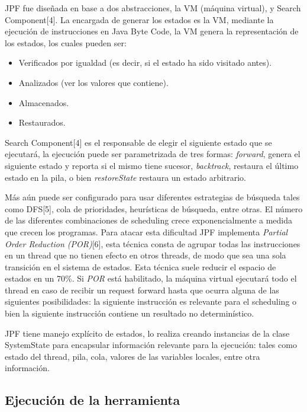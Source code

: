 \documentclass[runningheads]{llncs}
\begin{document}
JPF fue dise\~nada en base a dos abstracciones, la VM (m\'aquina virtual), y Search Component[4].
La encargada de generar los estados es la VM, mediante la ejecuci\'on de instrucciones en Java Byte Code, la VM  genera la representaci\'on de los estados, los cuales pueden ser:

\begin{itemize}
\item Verificados por igualdad (es decir, si el estado ha sido visitado antes).
\item Analizados (ver los valores que contiene).
\item Almacenados.
\item Restaurados.
\end{itemize}

Search Component[4] es el responsable de elegir el siguiente estado que se ejecutar\'a, la ejecuci\'on puede ser parametrizada de tres formas: \textit{forward}, genera el siguiente estado y reporta si el mismo tiene sucesor, \textit{backtrack}, restaura el \'ultimo estado en la pila, o bien \textit{restoreState} restaura un estado arbitrario.

M\'as a\'un puede ser configurado para usar diferentes estrategias de b\'usqueda tales como DFS[5], cola de prioridades, heur\'isticas de b\'usqueda,  entre otras.
El n\'umero de las diferentes combinaciones de scheduling crece exponencialmente a medida que crecen los programas. Para atacar esta dificultad JPF implementa \textit{Partial Order Reduction (POR)}[6], esta t\'ecnica consta de agrupar todas las instrucciones en un thread que no tienen efecto en otros threads, de modo que sea una sola transici\'on en el sistema de estados. Esta t\'ecnica suele reducir el espacio de estados en un 70\%.
Si \textit{POR} est\'a habilitado, la máquina virtual ejecutar\'a todo el thread en caso de recibir un request forward hasta que ocurra alguna de las siguientes posibilidades: la siguiente instrucci\'on es relevante para el scheduling o bien la siguiente instrucci\'on contiene un resultado no determin\'istico.

JPF tiene manejo expl\'icito de estados, lo realiza creando instancias de la clase SystemState para encapsular informaci\'on relevante para la ejecuci\'on: tales como estado del thread, pila, cola, valores de las variables locales, entre otra informaci\'on.

\subsection{Ejecuci\'on de la herramienta}
\end{document}
